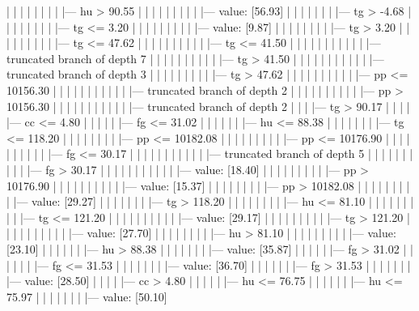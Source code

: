 \documentclass[UTF8, a4paper]{ctexart}
\begin{document}
|   |   |   |   |   |   |   |   |--- hu >  90.55
|   |   |   |   |   |   |   |   |   |--- value: [56.93]
|   |   |   |   |   |   |   |--- tg >  -4.68
|   |   |   |   |   |   |   |   |--- tg <= 3.20
|   |   |   |   |   |   |   |   |   |--- value: [9.87]
|   |   |   |   |   |   |   |   |--- tg >  3.20
|   |   |   |   |   |   |   |   |   |--- tg <= 47.62
|   |   |   |   |   |   |   |   |   |   |--- tg <= 41.50
|   |   |   |   |   |   |   |   |   |   |   |--- truncated branch of depth 7
|   |   |   |   |   |   |   |   |   |   |--- tg >  41.50
|   |   |   |   |   |   |   |   |   |   |   |--- truncated branch of depth 3
|   |   |   |   |   |   |   |   |   |--- tg >  47.62
|   |   |   |   |   |   |   |   |   |   |--- pp <= 10156.30
|   |   |   |   |   |   |   |   |   |   |   |--- truncated branch of depth 2
|   |   |   |   |   |   |   |   |   |   |--- pp >  10156.30
|   |   |   |   |   |   |   |   |   |   |   |--- truncated branch of depth 2
|   |   |   |--- tg >  90.17
|   |   |   |   |--- cc <= 4.80
|   |   |   |   |   |--- fg <= 31.02
|   |   |   |   |   |   |--- hu <= 88.38
|   |   |   |   |   |   |   |--- tg <= 118.20
|   |   |   |   |   |   |   |   |--- pp <= 10182.08
|   |   |   |   |   |   |   |   |   |--- pp <= 10176.90
|   |   |   |   |   |   |   |   |   |   |--- fg <= 30.17
|   |   |   |   |   |   |   |   |   |   |   |--- truncated branch of depth 5
|   |   |   |   |   |   |   |   |   |   |--- fg >  30.17
|   |   |   |   |   |   |   |   |   |   |   |--- value: [18.40]
|   |   |   |   |   |   |   |   |   |--- pp >  10176.90
|   |   |   |   |   |   |   |   |   |   |--- value: [15.37]
|   |   |   |   |   |   |   |   |--- pp >  10182.08
|   |   |   |   |   |   |   |   |   |--- value: [29.27]
|   |   |   |   |   |   |   |--- tg >  118.20
|   |   |   |   |   |   |   |   |--- hu <= 81.10
|   |   |   |   |   |   |   |   |   |--- tg <= 121.20
|   |   |   |   |   |   |   |   |   |   |--- value: [29.17]
|   |   |   |   |   |   |   |   |   |--- tg >  121.20
|   |   |   |   |   |   |   |   |   |   |--- value: [27.70]
|   |   |   |   |   |   |   |   |--- hu >  81.10
|   |   |   |   |   |   |   |   |   |--- value: [23.10]
|   |   |   |   |   |   |--- hu >  88.38
|   |   |   |   |   |   |   |--- value: [35.87]
|   |   |   |   |   |--- fg >  31.02
|   |   |   |   |   |   |--- fg <= 31.53
|   |   |   |   |   |   |   |--- value: [36.70]
|   |   |   |   |   |   |--- fg >  31.53
|   |   |   |   |   |   |   |--- value: [28.50]
|   |   |   |   |--- cc >  4.80
|   |   |   |   |   |--- hu <= 76.75
|   |   |   |   |   |   |--- hu <= 75.97
|   |   |   |   |   |   |   |--- value: [50.10]
\end{document}
